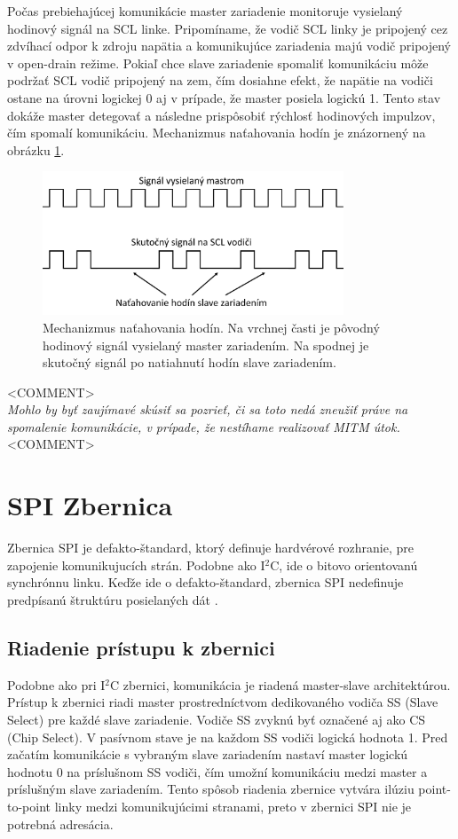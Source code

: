 Počas prebiehajúcej komunikácie master zariadenie monitoruje vysielaný hodinový signál na SCL linke. Pripomíname, že vodič SCL linky je pripojený cez zdvíhací odpor k zdroju napätia a komunikujúce zariadenia majú vodič pripojený v open-drain režime. Pokiaľ chce slave zariadenie spomaliť komunikáciu môže podržať SCL vodič pripojený na zem, čím dosiahne efekt, že napätie na vodiči ostane na úrovni logickej 0 aj v prípade, že master posiela logickú 1. Tento stav dokáže master detegovať a následne prispôsobiť rýchlosť hodinových impulzov, čím spomalí komunikáciu. Mechanizmus naťahovania hodín je znázornený na obrázku \ref{obr:i2cStretch}.

\begin{figure}
    \centerline{\includegraphics[width=0.8\textwidth]{images/i2cStretch.png}}
    \caption[Mechanizmus naťahovania hodín]{Mechanizmus naťahovania hodín. Na vrchnej časti je pôvodný hodinový signál vysielaný master zariadením. Na spodnej je skutočný signál po natiahnutí hodín slave zariadením.}
    \label{obr:i2cStretch}
\end{figure}

\noindent<COMMENT>\\ 
\textit{Mohlo by byť zaujímavé skúsiť sa pozrieť, či sa toto nedá zneužiť práve na  spomalenie komunikácie, v prípade, že nestíhame realizovať MITM útok.}\\
<COMMENT>

\section{SPI Zbernica}
Zbernica SPI je defakto-štandard, ktorý definuje hardvérové rozhranie, pre zapojenie komunikujucích strán. Podobne ako I$^2$C, ide o bitovo orientovanú synchrónnu linku. Keďže ide o defakto-štandard, zbernica SPI nedefinuje predpísanú štruktúru posielaných dát \cite{spiBus}.

\subsection{Riadenie prístupu k zbernici}
Podobne ako pri I$^2$C zbernici, komunikácia je riadená master-slave architektúrou. Prístup k zbernici riadi master prostredníctvom dedikovaného vodiča SS (Slave Select) pre každé slave zariadenie. Vodiče SS zvyknú byť označené aj ako CS (Chip Select). V pasívnom stave je na každom SS vodiči logická hodnota 1. Pred začatím komunikácie s vybraným slave zariadením nastaví master logickú hodnotu 0 na príslušnom SS vodiči, čím umožní komunikáciu medzi master a príslušným slave zariadením. Tento spôsob riadenia zbernice vytvára ilúziu point-to-point linky medzi komunikujúcimi stranami, preto v zbernici SPI nie je potrebná adresácia.

